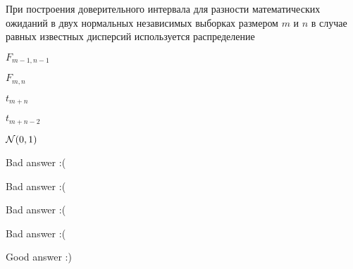 
\begin{question}
При построения доверительного интервала для разности математических
ожиданий в двух нормальных независимых выборках размером \(m\) и \(n\) в
случае равных известных дисперсий используется распределение
\begin{answerlist}
  \item \(F_{m-1, n-1}\)
  \item \(F_{m,n}\)
  \item \(t_{m+n}\)
  \item \(t_{m+n-2}\)
  \item \(\mathcal{N}(0, 1)\)
\end{answerlist}
\end{question}

\begin{solution}
\begin{answerlist}
  \item Bad answer :(
  \item Bad answer :(
  \item Bad answer :(
  \item Bad answer :(
  \item Good answer :)
\end{answerlist}
\end{solution}

